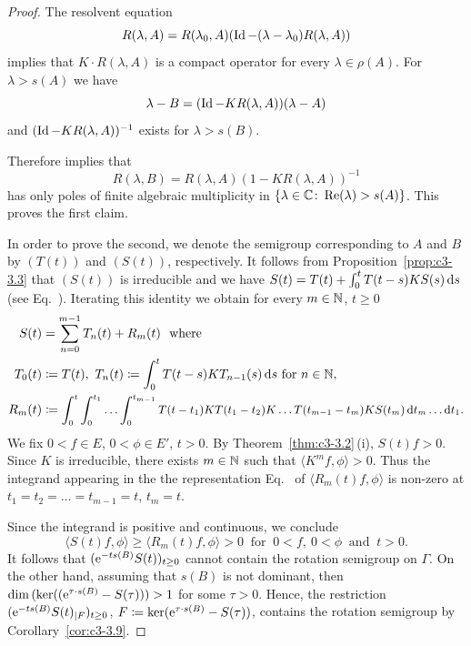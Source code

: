 \begin{proof}
The resolvent equation %
\[
	R(\lambda,A) = R(\lambda_{0},A)(\operatorname{Id} - (\lambda-\lambda_{0})R(\lambda,A))
\]
%
implies that $K \cdot R(\lambda,A)$ is a compact operator for every $\lambda \in \rho(A)$. 
For $\lambda > s(A)$ we have 
%
\[
	\lambda - B = (\operatorname{Id} - KR(\lambda,A))(\lambda-A)
\]
%
and $(\operatorname{Id} - KR(\lambda,A))^{-1}$ exists for $\lambda > s(B)$.

Therefore \textcite[Theorem XIII.13]{reedsimon:1979} 
implies that %
\[
	R(\lambda,B) = R(\lambda,A)(1 - KR(\lambda,A))^{-1}
\]
%
has only poles of finite algebraic multiplicity in $\{\lambda \in \mathbb{C}  \colon \mathop{}\!\mathrm{Re}(\lambda) > s(A)\}$. 
This proves the first claim.

In order to prove the second, we denote the semigroup corresponding to $A$ and $B$ by $(T(t))$ and $(S(t))$,  respectively.
It follows from Proposition~\ref{prop:c3-3.3} that $(S(t))$ is irreducible and we have $S(t) = T(t) + \int_{0}^{t} T(t-s)KS(s)\mathop{}\!\mathrm{d}{s}$ (see Eq.~). 
Iterating this identity we obtain for every $m \in \mathbb{N}$, $t \geq 0$
\begin{equation}\label{eq:c3-3.21}
\begin{split}
    S(t) &= \sum_{n=0}^{m-1} T_{n}(t) + R_{m}(t) \ \text{ where}\\ 
    T_{0}(t)&\coloneq T(t),\  T_{n}(t) \coloneq  \int_{0}^{t} T(t-s)KT_{n-1}(s)\mathop{}\!\mathrm{d}{s} \text{ for } n \in \mathbb{N} , \\
    R_{m}(t) &\coloneq \textit{\small $\int_{0}^{t}\int_{0}^{t_{1}} \ldots \int_{0}^{t_{m-1}} T(t-t_{1})KT(t_{1}-t_{2})K \ldots T(t_{m-1}-t_m)KS(t_{m})\mathop{}\!\mathrm{d}{t} _{m}\ldots \mathop{}\!\mathrm{d}{t} _{1}$} .
\end{split}
\end{equation}
We fix $0 < f \in E$, $0 < \phi \in E'$, $t > 0$. 
By Theorem~\ref{thm:c3-3.2}\,(i), $S(t)f > 0$.
Since $K$ is irreducible, there exists $m \in \mathbb{N}$ such that $\langle K^{m}f,\phi\rangle > 0$. 
Thus the integrand appearing in the the representation Eq.~ of\/ $\langle R_{m}(t)f,\phi\rangle$ is non-zero at $t_{1}=t_{2}= \ldots =t_{m-1}=t$, $t_{m}= t$.

Since the integrand is positive and continuous, we conclude
\begin{equation}\label{eq:c3-3.22}%
    \langle S(t)f,\phi\rangle \geq \langle R_{m}(t)f,\phi\rangle > 0 \ \text{ for } \ 0 < f  ,   \ 0 < \phi \ \text{ and } \ t > 0 .
\end{equation}
It follows that $(\eu^{-ts(B)}S(t))_{t \geq 0}$ cannot contain the rotation semigroup on $\Gamma$. 
On the other hand, assuming that $s(B)$ is not dominant, then $\mathop{}\!\mathrm{dim}\,(\ker((\mathrm{e}^{\tau\cdot s(B)} - S(\tau))) > 1$ for some $\tau > 0$. 
Hence, the restriction $(\eu^{-ts(B)}S(t)_{|F})_{t \geq 0}$, $F \coloneq  \ker(\mathrm{e}^{\tau\cdot s(B)}- S(\tau))$, contains the rotation semigroup by Corollary~\ref{cor:c3-3.9}.
\end{proof}
